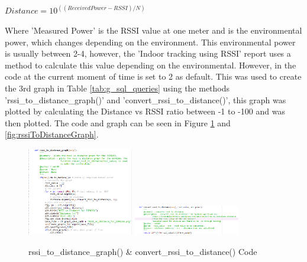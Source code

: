 \documentclass{report}
\begin{document}
\begin{center}
   $Distance = 10^{((Received Power-RSSI)/N)}$ 
\end{center}
Where 'Measured Power' is the RSSI value at one meter and is the environmental power, which changes depending on the environment. This environmental power is usually between 2-4, however, the 'Indoor tracking using RSSI' report\cite{IndoorTrackingRSSI} uses a method to calculate this value depending on the environmental. However, in the code at the current moment of time is set to 2 as default.  This was used to create the 3rd graph in Table \ref{tab:g_sql_queries} using the methods 'rssi\_to\_distance\_graph()' and 'convert\_rssi\_to\_distance()', this graph was plotted by calculating the Distance vs RSSI ratio between -1 to -100 and was then plotted. The code and graph can be seen in Figure \ref{fig:rssiToDistance} and \ref{fig:rssiToDistanceGraph}. 
\begin{figure}[h!]
    \centering
    \includegraphics[width=175]{rssiToDistance_1.PNG}
    \includegraphics[width=175]{rssiToDistance_2.PNG}
    \caption{rssi\_to\_distance\_graph() & convert\_rssi\_to\_distance() Code}
    \label{fig:rssiToDistance}
\end{figure} \\
\end{document}
